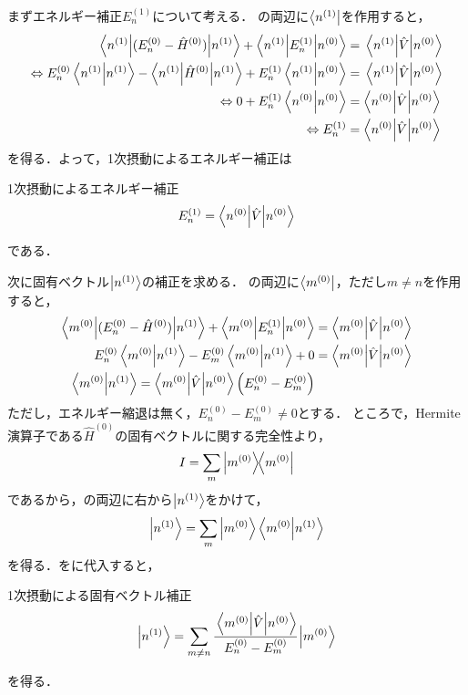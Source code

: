 \documentclass{report}
\begin{document}
  まずエネルギー補正$E_n^{(1)}$について考える．
  の両辺に$\bra{n^{(1)}}$を作用すると，
  \begin{align}
    \ev**{(E_n^{(0)} - \hat{H}^{(0)})}{n^{(1)}} + \mel**{n^{(1)}}{E_n^{(1)}}{n^{(0)}} &= \mel{n^{(1)}}{\hat{V}}{n^{(0)}} \\ 
    \Leftrightarrow E_n^{(0)}\braket{n^{(1)}} - \ev**{\hat{H}^{(0)}}{n^{(1)}} + E_n^{(1)}\braket{n^{(1)}}{n^{(0)}} &= \mel{n^{(1)}}{\hat{V}}{n^{(0)}} \\ 
    \Leftrightarrow 0 + E_n^{(1)}\braket{n^{(0)}} &= \ev**{\hat{V}}{n^{(0)}} \\ 
    \Leftrightarrow E_n^{(1)} &= \ev**{\hat{V}}{n^{(0)}}
  \end{align}
  を得る．よって，1次摂動によるエネルギー補正は
  \begin{itembox}[l]{1次摂動によるエネルギー補正}
    \begin{align}
      E_n^{(1)} = \ev**{\hat{V}}{n^{(0)}}
    \end{align}
  \end{itembox}
  である．
  \par
  次に固有ベクトル$\ket{n^{(1)}}$の補正を求める．
  の両辺に$\bra{m^{(0)}}$，ただし$m\neq n$を作用すると，
  \begin{align}
    \mel**{m^{(0)}}{(E_n^{(0)} - \hat{H}^{(0)})}{n^{(1)}} + \mel**{m^{(0)}}{E_n^{(1)}}{n^{(0)}} &= \mel**{m^{(0)}}{\hat{V}}{n^{(0)}} \\ 
    E_n^{(0)}\braket{m^{(0)}}{n^{(1)}} - E_m^{(0)}\braket{m^{(0)}}{n^{(1)}} + 0 &= \mel**{m^{(0)}}{\hat{V}}{n^{(0)}}\\
    \braket{m^{(0)}}{n^{(1)}} = \mel**{m^{(0)}}{\hat{V}}{n^{(0)}} \qty(E_n^{(0)} - E_m^{(0)}) \label{1st-perturbation-prep}\\
  \end{align}
  ただし，エネルギー縮退は無く，$E_n^{(0)}-E_m^{(0)} \neq 0$とする．
  ところで，Hermite演算子である$\hat{H}^{(0)}$の固有ベクトルに関する完全性より，
  \begin{align}
    I = \sum_{m}\ketbra{m^{(0)}}{m^{(0)}}\label{completeness}
  \end{align}
  であるから，の両辺に右から$\ket{n^{(1)}}$をかけて，
  \begin{align}
    \ket{n^{(1)}} = \sum_{m}\ket{m^{(0)}}\braket{m^{(0)}}{n^{(1)}}\label{n1-completeness-expantion}
  \end{align}
  を得る．をに代入すると，
  \begin{itembox}[l]{1次摂動による固有ベクトル補正}
    \begin{align}
      \ket{n^{(1)}} = \sum_{m\neq n}\cfrac{\mel**{m^{(0)}}{\hat{V}}{n^{(0)}}}{E_n^{(0)} - E_m^{(0)}}\ket{m^{(0)}}\label{1st-order-eigenvector}
    \end{align}
  \end{itembox}
  を得る．
\end{document}
